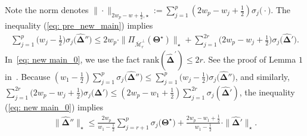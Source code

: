 \documentclass[alpha-refs]{wiley-article}
\begin{document}
Note the norm denotes $ \|\cdot\|_{2w_{p} - w + \frac{1}{2}, \star} := \sum^{p}_{j = 1} (2w_{p}-w_{j}+\frac{1}{2}) \sigma_{j}\big(\cdot\big)$.
The inequality (\ref{eq: pre_new_main}) implies
\begin{eqnarray} \label{eq: new main_0}
    \sum^{p}_{j = 1}\bigg(w_{j} - \frac{1}{2}\bigg)\sigma_{j}\big(\boldsymbol{\widehat{\Delta}}''\big) \leq  2w_{p} \cdot \|\Pi_{\overline{\mathcal{M}}_{r}^{\perp}}(\boldsymbol{\Theta^{\star}})\|_{\star} + \sum^{2r}_{j = 1} \bigg(2w_{p}-w_{j} + \frac{1}{2} \bigg) \sigma_{j}\big(\boldsymbol{\widehat{\Delta}}'\big).
\end{eqnarray}
In~\eqref{eq: new main_0}, we use the fact $\text{rank}(\boldsymbol{\widehat{\Delta}}^{'}) \leq 2r$.
See the proof of Lemma $1$ in~\cite{negahban2011estimation}.
Because  $(w_{1} - \frac{1}{2})\sum^{p}_{j = 1}\sigma_{j}\big(\boldsymbol{\widehat{\Delta}}''\big) \leq \sum^{p}_{j = 1}\big(w_{j} - \frac{1}{2}\big)\sigma_{j}\big(\boldsymbol{\widehat{\Delta}}''\big)$, and similarly, $\sum^{2r}_{j = 1}\big(2w_{p} - w_{j} +  \frac{1}{2}\big)\sigma_{j}\big(\boldsymbol{\widehat{\Delta}}'\big)\leq (2w_{p}-w_{1}+\frac{1}{2})\sum_{j=1}^{2r}\sigma_{j}(\boldsymbol{\widehat{\Delta}}')$,
the inequality (\ref{eq: new main_0}) implies
\begin{align}
    \|\boldsymbol{\widehat{\Delta}}''\|_{\star} \leq \frac{2w_{p}}{w_{1}-\frac{1}{2}} \sum_{j=r+1}^{p}\sigma_{j}\big(\boldsymbol{\Theta^{\star}}\big)
    + \frac{2w_{p}-w_{1}+\frac{1}{2}}{w_{1}-\frac{1}{2}}\cdot \| \boldsymbol{\widehat{\Delta}}' \|_{\star}.
    \label{eq: new main_1}
\end{align}

\end{document}
